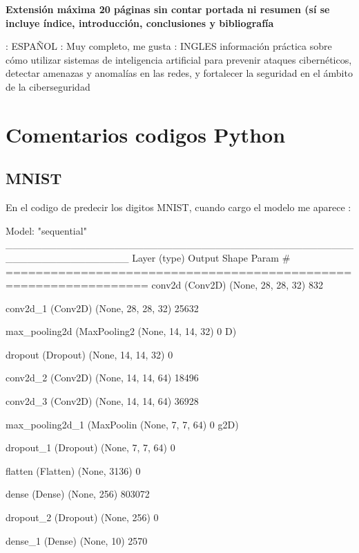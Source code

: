 \documentclass[11pt, a4paper]{article} %
\begin{document}
{\Large\textbf{Extensión máxima 20 páginas sin contar portada ni resumen (sí se incluye índice, introducción, conclusiones y bibliografía}}
\newpage

\citep{olabe1998redes} : ESPAÑOL : Muy completo, me gusta
\citep{parisi2019hands} : INGLES información práctica sobre cómo utilizar sistemas de inteligencia artificial para prevenir ataques cibernéticos, detectar amenazas y anomalías en las redes, y fortalecer la seguridad en el ámbito de la ciberseguridad


\section{Comentarios codigos Python}

\subsection{MNIST}

En el codigo de predecir los digitos MNIST, cuando cargo el modelo me aparece :

Model: "sequential"
_________________________________________________________________
 Layer (type)                Output Shape              Param #   
=================================================================
 conv2d (Conv2D)             (None, 28, 28, 32)        832       

 conv2d_1 (Conv2D)           (None, 28, 28, 32)        25632

 max_pooling2d (MaxPooling2  (None, 14, 14, 32)        0
 D)

 dropout (Dropout)           (None, 14, 14, 32)        0

 conv2d_2 (Conv2D)           (None, 14, 14, 64)        18496

 conv2d_3 (Conv2D)           (None, 14, 14, 64)        36928

 max_pooling2d_1 (MaxPoolin  (None, 7, 7, 64)          0
 g2D)

 dropout_1 (Dropout)         (None, 7, 7, 64)          0

 flatten (Flatten)           (None, 3136)              0

 dense (Dense)               (None, 256)               803072

 dropout_2 (Dropout)         (None, 256)               0

 dense_1 (Dense)             (None, 10)                2570
\end{document}
